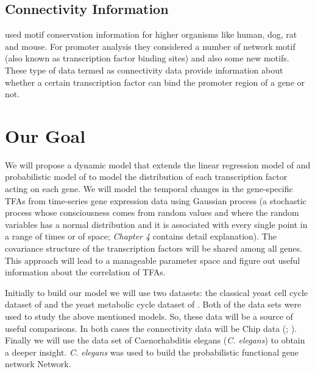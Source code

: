 \subsection{Connectivity Information}
\cite{Xie:2005} used motif conservation information for higher organisms like human, dog, rat 
and mouse. For promoter analysis they considered a number of network motif 
(also known as transcription factor binding sites) and also some new motifs. These type of data termed as 
connectivity data \cite{Liao:2003} provide information about whether a certain transcription factor 
can bind the promoter region of a gene or not.


\section{Our Goal}
We will propose a dynamic model that extends the linear regression model of \cite{Liao:2003} 
and probabilistic model of \cite{Sanguinetti:2006} to model the distribution of each transcription 
factor acting on each gene. We will model the temporal changes in the gene-specific TFAs from 
time-series gene expression data using Gaussian process (a stochastic process whose consciousness comes from 
random values and where the random variables has a normal distribution and it is associated with every single 
point in a range of times or of space; \textit{Chapter 4} contains detail explanation). 
The covariance structure of the transcription factors will be shared among all genes. 
This approach will lead to a manageable parameter space and figure out useful information about the 
correlation of TFAs.

Initially to build our model we will use two datasets: the classical yeast cell cycle dataset of 
\cite{Spellman:1998} and the yeast metabolic cycle dataset of \cite{Tu:2005}. Both of the data 
sets were used to study the above mentioned models. So, these data will be a source of useful comparisons. 
In both cases the connectivity data will be Chip data (\cite{Lee:2002}; \cite{Harbison:2004}). 
Finally we will use the data set of Caenorhabditis elegans (\textit{C. elegans}) to obtain a deeper insight. 
\textit{C. elegans} was used to build the probabilistic functional gene network Network.


